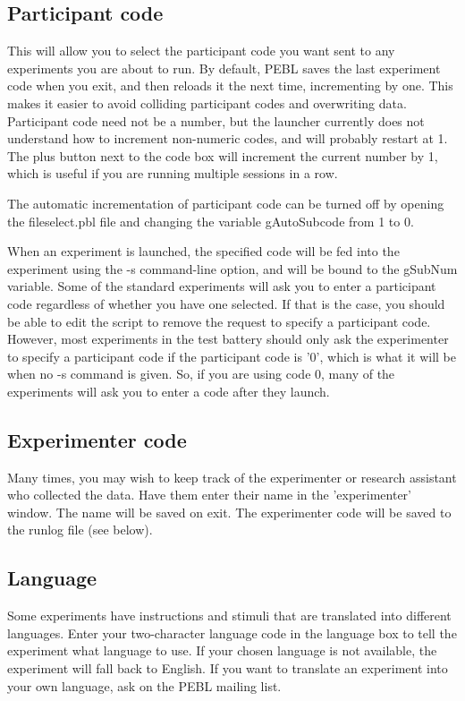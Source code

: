 \subsection{Participant code}
This will allow you to select the participant code you want sent to
any experiments you are about to run.  By default, PEBL saves the last
experiment code when you exit, and then reloads it the next time,
incrementing by one.  This makes it easier to avoid colliding
participant codes and overwriting data.  Participant code need not be
a number, but the launcher currently does not understand how to
increment non-numeric codes, and will probably restart at 1.  The plus button next to the 
code box will increment the current number by 1, which is useful if you are running multiple sessions in a row.

The automatic incrementation of participant code can be turned off by
opening the fileselect.pbl file and changing the variable gAutoSubcode
from 1 to 0.

When an experiment is launched, the specified code will be fed into
the experiment using the -s command-line option, and will be bound to
the gSubNum variable.  Some of the standard experiments will ask you
to enter a participant code regardless of whether you have one selected.
If that is the case, you should be able to edit the script to remove
the request to specify a participant code. However, most experiments in
the test battery should only ask the experimenter to specify a participant
code if the participant code is '0', which is what it will be when no -s
command is given.  So, if you are using code 0, many of the
experiments will ask you to enter a code after they launch.


\subsection{Experimenter code}
Many times, you may wish to keep track of the experimenter or research
assistant who collected the data.  Have them enter their name in the
'experimenter' window.  The name will be saved on exit.  The
experimenter code will be saved to the runlog file (see below). 

\subsection{Language}
Some experiments have instructions and stimuli that are translated
into different languages.  Enter your two-character language code in
the language box to tell the experiment what language to use. If your
chosen language is not available, the experiment will fall back to
English.  If you want to translate an experiment into your own
language, ask on the PEBL mailing list.

